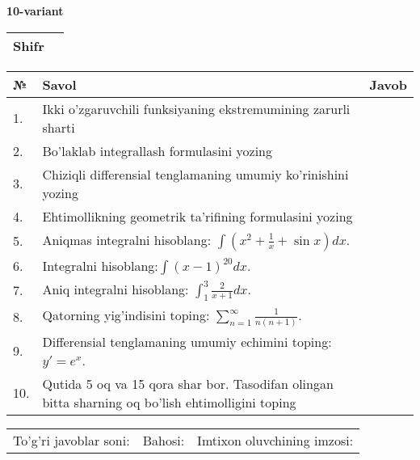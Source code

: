 \documentclass{article}
\begin{document}
  \egroup
  
  \newpage
  
  
  \textbf{10-variant}\\
  
  \bgroup
  \def\arraystretch{1.6} %
  
  \begin{tabular}{|m{5.7cm}|m{9.5cm}|}
  \hline
  Shifr & \\
  \hline
  \end{tabular}
  
  \vspace{1cm}
  
  \begin{tabular}{|m{0.7cm}|m{10cm}|m{4cm}|}
  \hline
  № & Savol & Javob \\
  \hline
  1. & Ikki o'zgaruvchili funksiyaning ekstremumining zarurli sharti &  \\
  \hline
  2. & Bo'laklab integrallash formulasini yozing &  \\
  \hline
  3. & Chiziqli differensial tenglamaning umumiy ko'rinishini yozing &  \\
  \hline
  4. & Ehtimollikning geometrik ta'rifining formulasini yozing &  \\
  \hline
  5. & Aniqmas integralni hisoblang: \(\int {\left( x^{2} + \frac{1}{x} + \sin x \right)dx}\). &  \\
  \hline
  6. & Integralni hisoblang:\(\int {(x - 1)^{20}}dx\). &  \\
  \hline
  7. & Aniq integralni hisoblang: \(\int_{1}^{3}\frac{2}{x + 1}dx\). &  \\
  \hline
  8. & Qatorning yig'indisini toping: \(\sum_{n = 1}^{\infty}\frac{1}{n(n + 1)}\). &  \\
  \hline
  9. & Differensial tenglamaning umumiy echimini toping: \(y' = e^{x}\). &  \\
  \hline
  10. & Qutida 5 oq va 15 qora shar bor. Tasodifan olingan bitta sharning oq bo'lish ehtimolligini toping &  \\
  \hline
  \end{tabular}
  
  \vspace{1cm}
  
  \begin{tabular}{lll}
  To'g'ri javoblar soni: \underline{\hspace{1.5cm}} & 
  Bahosi: \underline{\hspace{1.5cm}} & 
  Imtixon oluvchining imzosi: \underline{\hspace{2cm}} \\
  \end{tabular}
  
\end{document}
